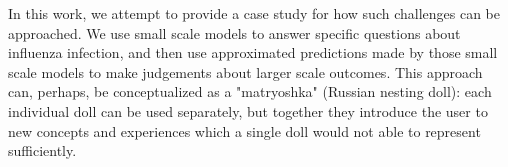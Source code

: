 In this work, we attempt to provide a case study for how such challenges can be approached. We use small scale models to answer specific questions about influenza infection, and then use approximated predictions made by those small scale models to make judgements about larger scale outcomes. This approach can, perhaps, be conceptualized as a "matryoshka" (Russian nesting doll): each individual doll can be used separately, but together they introduce the user to new concepts and experiences which a single doll would not able to represent sufficiently.

















%